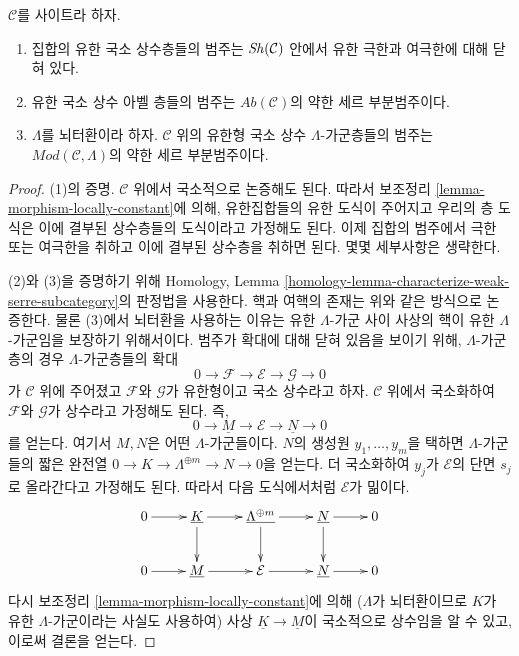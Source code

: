 \begin{lemma}
\label{lemma-kernel-finite-locally-constant}
$\mathcal{C}$를 사이트라 하자.
\begin{enumerate}
\item 집합의 유한 국소 상수층들의 범주는 $\mathop{\mathit{Sh}}\nolimits(\mathcal{C})$ 안에서
유한 극한과 여극한에 대해 닫혀 있다.
\item 유한 국소 상수 아벨 층들의 범주는
$\textit{Ab}(\mathcal{C})$의 약한 세르 부분범주이다.
\item $\Lambda$를 뇌터환이라 하자. $\mathcal{C}$ 위의 유한형 국소
상수 $\Lambda$-가군층들의 범주는
$\textit{Mod}(\mathcal{C}, \Lambda)$의 약한 세르 부분범주이다.
\end{enumerate}
\end{lemma}

\begin{proof}
(1)의 증명. $\mathcal{C}$ 위에서 국소적으로 논증해도 된다. 따라서
보조정리 \ref{lemma-morphism-locally-constant}에 의해, 유한집합들의
유한 도식이 주어지고 우리의 층 도식은 이에 결부된 상수층들의
도식이라고 가정해도 된다. 이제 집합의 범주에서 극한 또는 여극한을
취하고 이에 결부된 상수층을 취하면 된다. 몇몇 세부사항은 생략한다.

\medskip\noindent
(2)와 (3)을 증명하기 위해 Homology, Lemma
\ref{homology-lemma-characterize-weak-serre-subcategory}의 판정법을
사용한다. 핵과 여핵의 존재는 위와 같은 방식으로 논증한다. 물론
(3)에서 뇌터환을 사용하는 이유는 유한 $\Lambda$-가군 사이 사상의
핵이 유한 $\Lambda$-가군임을 보장하기 위해서이다.
범주가 확대에 대해 닫혀 있음을 보이기 위해, $\Lambda$-가군층의 경우
$\Lambda$-가군층들의 확대
$$
0 \to \mathcal{F} \to \mathcal{E} \to \mathcal{G} \to 0
$$
가 $\mathcal{C}$ 위에 주어졌고 $\mathcal{F}$와 $\mathcal{G}$가
유한형이고 국소 상수라고 하자. $\mathcal{C}$ 위에서 국소화하여
$\mathcal{F}$와 $\mathcal{G}$가 상수라고 가정해도 된다. 즉,
$$
0 \to \underline{M} \to \mathcal{E} \to \underline{N} \to 0
$$
를 얻는다. 여기서 $M, N$은 어떤 $\Lambda$-가군들이다. $N$의 생성원
$y_1, \ldots, y_m$을 택하면 $\Lambda$-가군들의 짧은 완전열
$0 \to K \to \Lambda^{\oplus m} \to N \to 0$을 얻는다. 더 국소화하여
$y_j$가 $\mathcal{E}$의 단면 $s_j$로 올라간다고 가정해도 된다.
따라서 다음 도식에서처럼 $\mathcal{E}$가 밂이다.
$$
\xymatrix{
0 \ar[r] &
\underline{K} \ar[d] \ar[r] &
\underline{\Lambda^{\oplus m}} \ar[d] \ar[r] &
\underline{N} \ar[d] \ar[r] & 0 \\
0 \ar[r] &
\underline{M} \ar[r] &
\mathcal{E} \ar[r] &
\underline{N} \ar[r] & 0
}
$$
다시 보조정리 \ref{lemma-morphism-locally-constant}에 의해
($\Lambda$가 뇌터환이므로 $K$가 유한 $\Lambda$-가군이라는 사실도
사용하여) 사상 $\underline{K} \to \underline{M}$이 국소적으로
상수임을 알 수 있고, 이로써 결론을 얻는다.
\end{proof}

